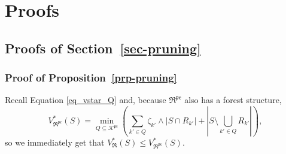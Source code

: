 \documentclass[
  11pt,
  a4paper,
]{article}
\theoremstyle{plain}
\theoremstyle{definition}
\theoremstyle{plain}
\theoremstyle{definition}
\theoremstyle{plain}
\theoremstyle{remark}
\begin{document}
\section{Proofs}\label{sec-proofs}

\subsection{\texorpdfstring{Proofs of
Section~\ref{sec-pruning}}{Proofs of Section~}}\label{sec-pruning-proofs}

\subsubsection{\texorpdfstring{Proof of
Proposition~\ref{prp-pruning}}{Proof of Proposition~}}\label{sec-pruning-proofs-pruning}

Recall Equation \eqref{eq_vstar_Q} and, because
\(\mathfrak{R}^{\mathfrak{pr}}\) also has a forest structure,
\begin{equation}
V^*_{\mathfrak{R}^{\mathfrak{pr}}}(S)=\min_{Q\subseteq\mathcal{K}^{\mathfrak{pr}}}\left(\sum_{k'\in Q}\zeta_{k'}\wedge|S\cap R_{k'}|+\left| S\setminus\bigcup_{k'\in Q} R_{k'}   \right|\right),
\label{eq_vstarpruned_Q}
\end{equation} so we immediately get that
\(V^*_{\mathfrak{R}}(S)\leq V^*_{\mathfrak{R}^{\mathfrak{pr}}}(S)\).
\end{document}
